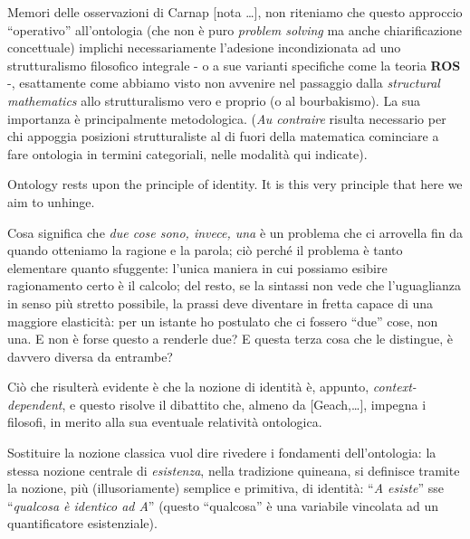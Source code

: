 Memori delle osservazioni di Carnap [nota \dots], non riteniamo che questo approccio ``operativo'' all'ontologia (che non è puro \textit{problem solving} ma anche chiarificazione concettuale) implichi necessariamente l'adesione incondizionata ad uno strutturalismo filosofico integrale - o a sue varianti specifiche come la teoria \textbf{ROS} -, esattamente come abbiamo visto non avvenire nel passaggio dalla \textit{structural mathematics} allo strutturalismo vero e proprio (o al bourbakismo). La sua importanza è principalmente metodologica. (\textit{Au contraire} risulta necessario per chi appoggia posizioni strutturaliste al di fuori della matematica cominciare a fare ontologia in termini categoriali, nelle modalità qui indicate).
	
	
	Ontology rests upon the principle of identity. It is this very principle that here we aim to unhinge.

	Cosa significa che \emph{due cose sono, invece, una} è un problema che ci arrovella fin da quando otteniamo la ragione e la parola; ciò perché il problema è tanto elementare quanto sfuggente: l'unica maniera in cui possiamo esibire ragionamento certo è il calcolo; del resto, se la sintassi non vede che l'uguaglianza in senso più stretto possibile, la prassi deve diventare in fretta capace di una maggiore elasticità: per un istante ho postulato che ci fossero ``due'' cose, non una. E non è forse questo a renderle due? E questa terza cosa che le distingue, è davvero diversa da entrambe?

	Ciò che risulterà evidente è che la nozione di identità è, appunto, \emph{context-dependent}, e questo risolve il dibattito che, almeno da [Geach,\dots], impegna i filosofi, in merito alla sua eventuale relatività ontologica.

	Sostituire la nozione classica vuol dire rivedere i fondamenti dell'ontologia: la stessa nozione centrale di \emph{esistenza}, nella tradizione quineana, si definisce tramite la nozione, più (illusoriamente) semplice e primitiva, di identità: ``\textit{A esiste}'' sse ``\textit{qualcosa è identico ad A}'' (questo ``qualcosa'' è una variabile vincolata ad un quantificatore esistenziale).

